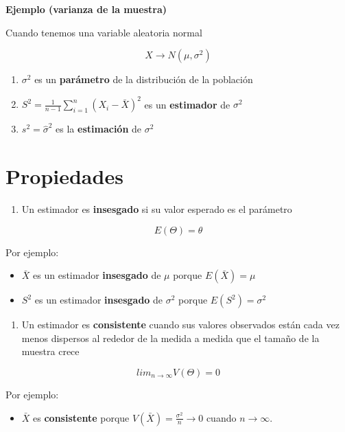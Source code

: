 \documentclass[
]{book}
\providecommand{\tightlist}{%
  \setlength{\itemsep}{0pt}\setlength{\parskip}{0pt}}
\begin{document}
\textbf{Ejemplo (varianza de la muestra)}

Cuando tenemos una variable aleatoria normal

\[X \rightarrow N(\mu, \sigma^2)\]

\begin{enumerate}
\def\labelenumi{\arabic{enumi}.}
\tightlist
\item
  \(\sigma^2\) es un \textbf{parámetro} de la distribución de la población
\item
  \(S^2=\frac{1}{n-1} \sum_{i=1}^n (X_i-\bar{X})^2\) es un \textbf{estimador} de \(\sigma^2\)
\item
  \(s^2=\hat{\sigma}^2\) es la \textbf{estimación} de \(\sigma^2\)
\end{enumerate}

\hypertarget{propiedades}{%
\section{Propiedades}\label{propiedades}}

\begin{enumerate}
\def\labelenumi{\arabic{enumi}.}
\tightlist
\item
  Un estimador es \textbf{insesgado} si su valor esperado es el parámetro
\end{enumerate}

\[E(\Theta)=\theta\]

Por ejemplo:

\begin{itemize}
\item
  \(\bar{X}\) es un estimador \textbf{insesgado} de \(\mu\) porque \(E(\bar{X})=\mu\)
\item
  \(S^2\) es un estimador \textbf{insesgado} de \(\sigma^2\) porque \(E(S^2)=\sigma^2\)
\end{itemize}

\begin{enumerate}
\def\labelenumi{\arabic{enumi}.}
\setcounter{enumi}{1}
\tightlist
\item
  Un estimador es \textbf{consistente} cuando sus valores observados están cada vez menos dispersos al rededor de la medida a medida que el tamaño de la muestra crece
\end{enumerate}

\[lim_{n\rightarrow \infty} V(\Theta) = 0\]

Por ejemplo:

\begin{itemize}
\tightlist
\item
  \(\bar{X}\) es \textbf{consistente} porque \(V(\bar{X})=\frac{\sigma^2}{n}\rightarrow 0\) cuando \(n \rightarrow \infty\).
\end{itemize}
\end{document}
